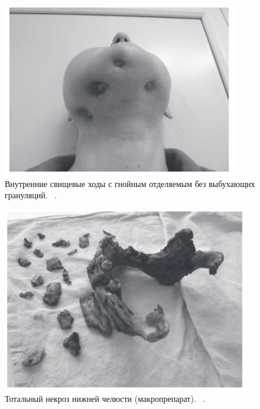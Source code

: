 \documentclass[11pt]{article}
\begin{document}
	\begin{figure}[H]
	\centering
	\includegraphics[width=\textwidth]{st3}
	\caption{Внутренние свищевые ходы с гнойным отделяемым без выбухающих грануляций. ~\cite{st}.}
	\label{fig:st3}
	\end{figure}

	\begin{figure}[H]
	\centering
	\includegraphics[width=\textwidth]{st4}
	\caption{Тотальный некроз нижней челюсти (макропрепарат). ~\cite{st}.}
	\label{fig:st4}
	\end{figure}
\end{document}
